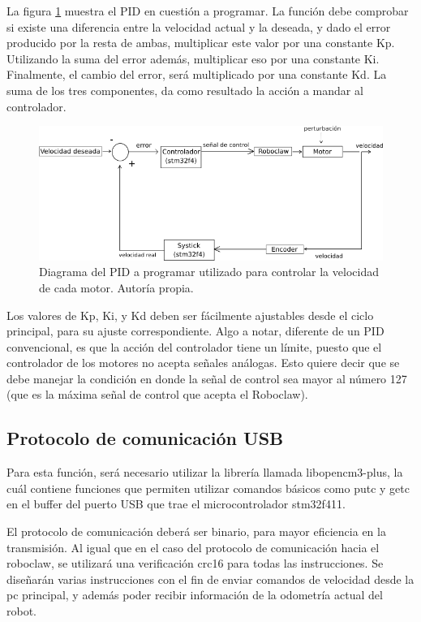 La figura \ref{F:pid_diagrama} muestra el PID en cuestión a programar. La función debe comprobar si existe una diferencia entre la velocidad actual y la deseada, y dado el error producido por la resta de ambas, multiplicar este valor por una constante Kp. Utilizando la suma del error además, multiplicar eso por una constante Ki. Finalmente, el cambio del error, será multiplicado por una constante Kd. La suma de los tres componentes, da como resultado la acción a mandar al controlador.

\begin{figure}[H]
\centering
\includegraphics[scale=0.7]{imagenes/diagrama_pid.png}
\caption{Diagrama del PID a programar utilizado para controlar la velocidad de cada motor. Autoría propia.}
\label{F:pid_diagrama}
\end{figure}

Los valores de Kp, Ki, y Kd deben ser fácilmente ajustables desde el ciclo principal, para su ajuste correspondiente. Algo a notar, diferente de un PID convencional, es que la acción del controlador tiene un límite, puesto que el controlador de los motores no acepta señales análogas. Esto quiere decir que se debe manejar la condición en donde la señal de control sea mayor al número 127 (que es la máxima señal de control que acepta el Roboclaw).

\subsection{Protocolo de comunicación USB}

\label{libreria}

Para esta función, será necesario utilizar la librería llamada libopencm3-plus, la cuál contiene funciones que permiten utilizar comandos básicos como putc y getc en el buffer del puerto USB que trae el microcontrolador stm32f411.

El protocolo de comunicación deberá ser binario, para mayor eficiencia en la transmisión. Al igual que en el caso del protocolo de comunicación hacia el roboclaw, se utilizará una verificación crc16 para todas las instrucciones. Se diseñarán varias instrucciones con el fin de enviar comandos de velocidad desde la pc principal, y además poder recibir información de la odometría actual del robot.

